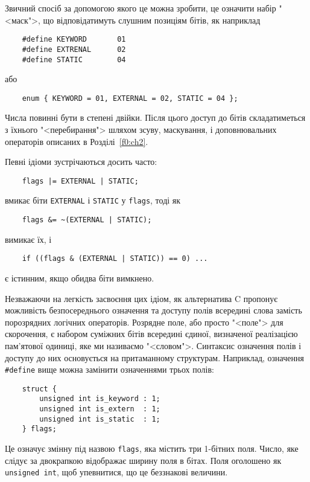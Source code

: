 \documentclass[a4paper,12pt]{book}
\begin{document}
  Звичний спосіб за допомогою якого це можна зробити, це означити набір
  "<маск">, що відповідатимуть слушним позиціям бітів, як наприклад
  \begin{verbatim}
    #define KEYWORD       01
    #define EXTRENAL      02
    #define STATIC        04
  \end{verbatim}
  або
  \begin{verbatim}
    enum { KEYWORD = 01, EXTERNAL = 02, STATIC = 04 };
  \end{verbatim}

  Числа повинні бути в степені двійки. Після цього доступ до бітів складатиметься з
  їхнього "<перебирання"> шляхом зсуву, маскування, і доповнювальних операторів
  описаних в Розділі~\ref{f0:ch2}.

  Певні ідіоми зустрічаються досить часто:
  \begin{verbatim}
    flags |= EXTERNAL | STATIC;
  \end{verbatim}
  вмикає біти \texttt{EXTERNAL} і \texttt{STATIC} у \texttt{flags}, тоді як
  \begin{verbatim}
    flags &= ~(EXTERNAL | STATIC);
  \end{verbatim}
  вимикає їх, і
  \begin{verbatim}
    if ((flags & (EXTERNAL | STATIC)) == 0) ...
  \end{verbatim}
  є істинним, якщо обидва біти вимкнено.

  Незважаючи на легкість засвоєння цих ідіом, як альтернатива C пропонує можливість
  безпосереднього означення та доступу полів всередині слова замість порозрядних логічних
  операторів. Розрядне поле, або просто "<поле"> для скорочення, є
  набором суміжних бітів всередині єдиної, визначеної реалізацією пам'ятової одиниці, яке
  ми називаємо "<словом">. Синтаксис означення полів і доступу до них
  основується на притаманному структурам. Наприклад, означення \texttt{\#define} вище можна
  замінити означеннями трьох полів:
  \begin{verbatim}
    struct {
        unsigned int is_keyword : 1;
        unsigned int is_extern  : 1;
        unsigned int is_static  : 1;
    } flags;
  \end{verbatim}

  Це означує змінну під назвою \texttt{flags}, яка містить три 1-бітних поля. Число, яке
  слідує за двокрапкою відображає ширину поля в бітах. Поля оголошено як \texttt{unsigned
  int}, щоб упевнитися, що це беззнакові величини.
\end{document}
